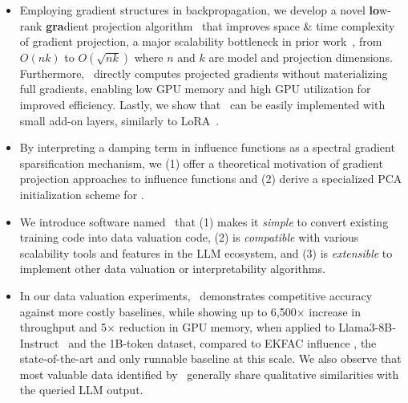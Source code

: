 \begin{itemize}[leftmargin=*,topsep=-2pt]
    \item Employing gradient structures in backpropagation, we develop a novel \textbf{lo}w-rank \textbf{gra}dient projection algorithm \method\ that improves space \& time complexity of gradient projection, a major scalability bottleneck in prior work~\cite{park2023trak,schioppa2022scaling}, from $O(nk)$ to $O(\sqrt{nk})$ where $n$ and $k$ are model and projection dimensions. Furthermore, \method\ directly computes projected gradients without materializing full gradients, enabling low GPU memory and high GPU utilization for improved efficiency. Lastly, we show that \method\ can be easily implemented with small add-on layers, similarly to LoRA~\cite{hu2021lora}.
    \item By interpreting a damping term in influence functions as a spectral gradient sparsification mechanism, we (1) offer a theoretical motivation of gradient projection approaches to influence functions and (2) derive a specialized PCA initialization scheme for \method.
    \item We introduce software named \software\ that (1) makes it \textit{simple} to convert existing training code into data valuation code, (2) is \textit{compatible} with various scalability tools and features in the LLM ecosystem, and (3) is \textit{extensible} to implement other data valuation or interpretability algorithms.
    \item In our data valuation experiments, \method\ demonstrates competitive accuracy against more costly baselines, while showing up to 6,500$\times$ increase in throughput and 5$\times$ reduction in GPU memory, when applied to Llama3-8B-Instruct~\cite{llama3modelcard} and the 1B-token dataset, compared to EKFAC influence \cite{grosse2023studying}, the state-of-the-art and only runnable baseline at this scale. We also observe that most valuable data identified by \method\ generally share qualitative similarities with the queried LLM output.
\end{itemize}